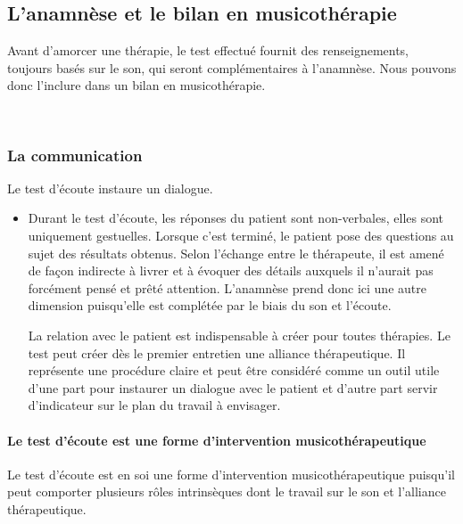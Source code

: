 \subsection{L'anamnèse et le bilan en musicothérapie}

  Avant d'amorcer une thérapie, le test effectué fournit des renseignements, toujours basés sur le son, qui seront complémentaires à l'anamnèse. Nous pouvons donc l'inclure dans un  bilan en musicothérapie.

  \
\subsubsection{La communication}

Le test d'écoute instaure un dialogue.
  
\begin{itemize}
  \item Durant le test d'écoute, les réponses du patient sont
    non-verbales, elles sont 
 uniquement gestuelles. Lorsque c'est terminé,
 le patient pose des questions au sujet des résultats obtenus. Selon
 l'échange entre le thérapeute, il est amené de façon
 indirecte à livrer et à évoquer des détails auxquels il
 n'aurait pas forcément pensé et prêté attention. L'anamnèse prend donc ici une autre
dimension puisqu'elle est complétée par le biais du son et l'écoute.

	 La relation avec le patient est indispensable à créer pour toutes thérapies. Le test peut créer dès le premier entretien une alliance thérapeutique.
	Il représente une procédure claire et  peut être
        considéré comme un outil utile d'une part pour instaurer un dialogue avec
        le patient et d'autre part servir d'indicateur sur le plan du travail à
        envisager.
  \end{itemize}      
\paragraph{Le test d'écoute est une forme d'intervention
  musicothérapeutique}

Le test d'écoute est en soi une forme d'intervention
 musicothérapeutique puisqu'il peut
 comporter plusieurs rôles intrinsèques dont le travail sur le son et
 l'alliance thérapeutique.
 



